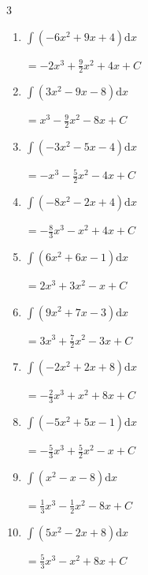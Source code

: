 \begin{multicols}{3}
\begin{enumerate}
        $\displaystyle =-3x^{3}+\frac{9}{2}x^{2}+5x+ C$

  \item $\displaystyle \int \left( -6x^{2}+9x+4 \right) \mathrm{d}x$

        $\displaystyle =-2x^{3}+\frac{9}{2}x^{2}+4x+ C$

  \item $\displaystyle \int \left( 3x^{2}-9x-8 \right) \mathrm{d}x$

        $\displaystyle =x^{3}-\frac{9}{2}x^{2}-8x+ C$

  \item $\displaystyle \int \left( -3x^{2}-5x-4 \right) \mathrm{d}x$

        $\displaystyle =-x^{3}-\frac{5}{2}x^{2}-4x+ C$

  \item $\displaystyle \int \left( -8x^{2}-2x+4 \right) \mathrm{d}x$

        $\displaystyle =-\frac{8}{3}x^{3}-x^{2}+4x+ C$

\columnbreak %

  \item $\displaystyle \int \left( 6x^{2}+6x-1 \right) \mathrm{d}x$

        $\displaystyle =2x^{3}+3x^{2}-x+ C$

  \item $\displaystyle \int \left( 9x^{2}+7x-3 \right) \mathrm{d}x$

        $\displaystyle =3x^{3}+\frac{7}{2}x^{2}-3x+ C$

  \item $\displaystyle \int \left( -2x^{2}+2x+8 \right) \mathrm{d}x$

        $\displaystyle =-\frac{2}{3}x^{3}+x^{2}+8x+ C$

  \item $\displaystyle \int \left( -5x^{2}+5x-1 \right) \mathrm{d}x$

        $\displaystyle =-\frac{5}{3}x^{3}+\frac{5}{2}x^{2}-x+ C$

  \item $\displaystyle \int \left( x^{2}-x-8 \right) \mathrm{d}x$

        $\displaystyle =\frac{1}{3}x^{3}-\frac{1}{2}x^{2}-8x+ C$

  \item $\displaystyle \int \left( 5x^{2}-2x+8 \right) \mathrm{d}x$

        $\displaystyle =\frac{5}{3}x^{3}-x^{2}+8x+ C$


\end{enumerate}
\end{multicols}
